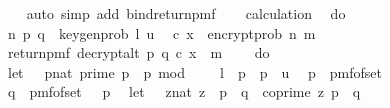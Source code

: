 \begin{isabellebody}
\ \ \ \isamarkupfalse%
\ {\isacharparenleft}{\kern0pt}auto\ simp\ add{\isacharcolon}{\kern0pt}\ bind{\isacharunderscore}{\kern0pt}return{\isacharunderscore}{\kern0pt}pmf{\isacharparenright}{\kern0pt}\isanewline
\isanewline
\ \ \isamarkupfalse%
\ calculation\ \isamarkupfalse%
\ {\isachardoublequoteopen}do\ {\isacharbraceleft}{\kern0pt}\isanewline
\ \ {\isacharparenleft}{\kern0pt}n{\isacharcomma}{\kern0pt}\ {\isacharparenleft}{\kern0pt}p{\isacharcomma}{\kern0pt}\ q{\isacharparenright}{\kern0pt}{\isacharparenright}{\kern0pt}\ {\isasymleftarrow}\ key{\isacharunderscore}{\kern0pt}gen{\isacharunderscore}{\kern0pt}prob\ l\ u{\isacharsemicolon}{\kern0pt}\isanewline
\ \ {\isacharparenleft}{\kern0pt}c{\isacharcomma}{\kern0pt}\ x{\isacharparenright}{\kern0pt}\ {\isasymleftarrow}\ {\isacharparenleft}{\kern0pt}encrypt{\isacharunderscore}{\kern0pt}prob\ n\ m{\isacharparenright}{\kern0pt}{\isacharsemicolon}{\kern0pt}\isanewline
\ \ return{\isacharunderscore}{\kern0pt}pmf\ {\isacharparenleft}{\kern0pt}decrypt{\isacharunderscore}{\kern0pt}alt\ p\ q\ {\isacharparenleft}{\kern0pt}c{\isacharcomma}{\kern0pt}\ x{\isacharparenright}{\kern0pt}\ {\isacharequal}{\kern0pt}\ m{\isacharparenright}{\kern0pt}{\isacharbraceright}{\kern0pt}\ \isanewline
\ \ {\isacharequal}{\kern0pt}\ do\ {\isacharbraceleft}{\kern0pt}\isanewline
\ \ let\ {\isasymK}\ {\isacharequal}{\kern0pt}\ {\isacharbraceleft}{\kern0pt}{\isacharparenleft}{\kern0pt}p{\isacharcolon}{\kern0pt}{\isacharcolon}{\kern0pt}nat{\isacharparenright}{\kern0pt}{\isachardot}{\kern0pt}\ prime\ p\ {\isasymand}\ p\ mod\ {}\ {\isacharequal}{\kern0pt}\ {}\ {\isasymand}\ l\ {\isasymle}\ p\ {\isasymand}\ p\ {\isasymle}\ u{\isacharbraceright}{\kern0pt}{\isacharsemicolon}{\kern0pt}\isanewline
\ \ p\ {\isasymleftarrow}\ pmf{\isacharunderscore}{\kern0pt}of{\isacharunderscore}{\kern0pt}set\ {\isasymK}{\isacharsemicolon}{\kern0pt}\ \isanewline
\ \ q\ {\isasymleftarrow}\ pmf{\isacharunderscore}{\kern0pt}of{\isacharunderscore}{\kern0pt}set\ {\isacharparenleft}{\kern0pt}{\isasymK}\ {\isacharminus}{\kern0pt}\ {\isacharbraceleft}{\kern0pt}p{\isacharbraceright}{\kern0pt}{\isacharparenright}{\kern0pt}{\isacharsemicolon}{\kern0pt}\isanewline
\ \ let\ {\isasymZ}\ {\isacharequal}{\kern0pt}\ {\isacharbraceleft}{\kern0pt}{\isacharparenleft}{\kern0pt}z{\isacharcolon}{\kern0pt}{\isacharcolon}{\kern0pt}nat{\isacharparenright}{\kern0pt}{\isachardot}{\kern0pt}\ z\ {\isacharless}{\kern0pt}\ p\ {\isacharasterisk}{\kern0pt}\ q\ {\isasymand}\ coprime\ z\ {\isacharparenleft}{\kern0pt}p\ {\isacharasterisk}{\kern0pt}\ q{\isacharparenright}{\kern0pt}{\isacharbraceright}{\kern0pt}{\isacharsemicolon}{\kern0pt}\isanewline

\end{isabellebody}
